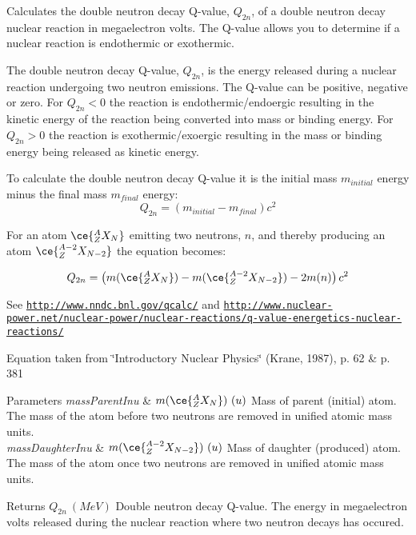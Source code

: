 Calculates the double neutron decay Q-\/value, $Q_{2n}$, of a double neutron decay nuclear reaction in megaelectron volts. The Q-\/value allows you to determine if a nuclear reaction is endothermic or exothermic. 

The double neutron decay Q-\/value, $Q_{2n}$, is the energy released during a nuclear reaction undergoing two neutron emissions. The Q-\/value can be positive, negative or zero. For $Q_{2n} < 0$ the reaction is endothermic/endoergic resulting in the kinetic energy of the reaction being converted into mass or binding energy. For $Q_{2n} > 0$ the reaction is exothermic/exoergic resulting in the mass or binding energy being released as kinetic energy.

To calculate the double neutron decay Q-\/value it is the initial mass $m_{initial}$ energy minus the final mass $m_{final}$ energy\+: \[Q_{2n} = \left ( m_{initial}-m_{final}\right ) c^2\]

For an atom $\ce{ ^{A}_{Z}X_{N} }$ emitting two neutrons, $n$, and thereby producing an atom $\ce{ ^{A-2}_{Z}X_{N-2} }$ the equation becomes\+:

\[Q_{2n} = \left ( m(\ce{ ^{A}_{Z}X_{N} }) - m(\ce{ ^{A-2}_{Z}X_{N-2} }) - 2m(n) \right ) c^2\]

See \href{http://www.nndc.bnl.gov/qcalc/}{\tt http\+://www.\+nndc.\+bnl.\+gov/qcalc/} and \href{http://www.nuclear-power.net/nuclear-power/nuclear-reactions/q-value-energetics-nuclear-reactions/}{\tt http\+://www.\+nuclear-\/power.\+net/nuclear-\/power/nuclear-\/reactions/q-\/value-\/energetics-\/nuclear-\/reactions/}

Equation taken from \char`\"{}\+Introductory Nuclear Physics\char`\"{} (Krane, 1987), p. 62 \& p. 381


\begin{DoxyParams}{Parameters}
{\em mass\+Parent\+Inu} & $m(\ce{ ^{A}_{Z}X_{N} })\ (u)$ Mass of parent (initial) atom. The mass of the atom before two neutrons are removed in unified atomic mass units. \\
\hline
{\em mass\+Daughter\+Inu} & $m(\ce{ ^{A-2}_{Z}X_{N-2} })\ (u)$ Mass of daughter (produced) atom. The mass of the atom once two neutrons are removed in unified atomic mass units. \\
\hline
\end{DoxyParams}
\begin{DoxyReturn}{Returns}
$Q_{2n}\ (MeV)$ Double neutron decay Q-\/value. The energy in megaelectron volts released during the nuclear reaction where two neutron decays has occured. 
\end{DoxyReturn}
\mbox{\label{group___q_value_ga64a3867f65de5586feab99527bb03d31}} 
